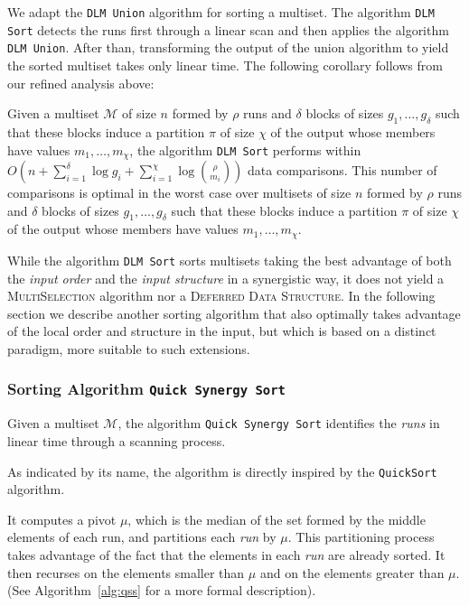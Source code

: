 We adapt the \texttt{DLM Union} algorithm for sorting a multiset.  The
algorithm \texttt{DLM Sort} detects the runs first through a linear
scan and then applies the algorithm \texttt{DLM Union}. After than,
transforming the output of the union algorithm to yield the sorted
multiset takes only linear time. The following corollary follows from
our refined analysis above:

\begin{corollary}
  Given a multiset $\mathcal{M}$ of size $n$ formed by $\rho$ runs and
  $\delta$ blocks of sizes $g_1, \dots, g_{\delta}$ such that these
  blocks induce a partition $\pi$ of size $\chi$ of the output whose
  members have values $m_1, \dots, m_{\chi}$, the algorithm {\tt{DLM Sort}} performs
  within
  $O(n + \sum^{\delta}_{i=1}\log g_i +
  \sum^{\chi}_{i=1}\log{\binom{\rho}{m_i}})$ data comparisons. This
  number of comparisons is optimal in the worst case over multisets of
  size $n$ formed by $\rho$ runs and $\delta$ blocks of sizes
  $g_1, \dots, g_{\delta}$ such that these blocks induce a partition
  $\pi$ of size $\chi$ of the output whose members have values
  $m_1, \dots, m_{\chi}$.
\end{corollary}

While the algorithm \texttt{DLM Sort} sorts multisets taking the best
advantage of both the \emph{input order} and the \emph{input
  structure} in a synergistic way, it does not yield a
\textsc{MultiSelection} algorithm nor a \textsc{Deferred Data
  Structure}. In the following section we
describe another sorting algorithm that also optimally takes advantage
of the local order and structure in the input, but which is based on a
distinct paradigm, more suitable to such extensions.

\subsubsection{Sorting Algorithm {\texttt{Quick Synergy
      Sort}}}
\label{sec:qss}

Given a multiset $\mathcal{M}$, the algorithm \texttt{Quick Synergy
  Sort} identifies the \emph{runs} in linear time through a scanning
process. \begin{LONG} As indicated by its name, the algorithm is
  directly inspired by the
  \texttt{QuickSort}~\cite{1961-CACM-Quicksort-Hoare}
  algorithm.\end{LONG} It computes a pivot $\mu$, which is the median
of the set formed by the middle elements of each run, and partitions
each \emph{run} by $\mu$. This partitioning process takes advantage of
the fact that the elements in each \emph{run} are already sorted. It
then recurses on the elements smaller than $\mu$ and on the elements
greater than $\mu$. (See Algorithm~\ref{alg:qss} for a more formal
description).

